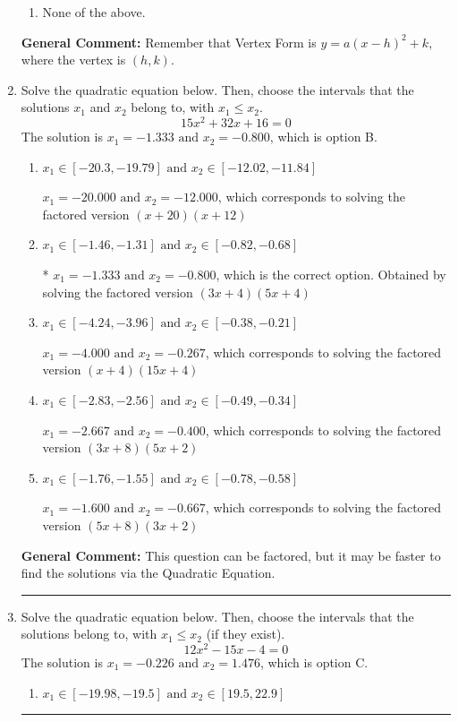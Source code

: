 \documentclass{extbook}[14pt]
\newcommand{\litem}[1]{\item #1

\rule{\textwidth}{0.4pt}}
\begin{document}
\begin{enumerate}
{\begin{enumerate}[label=\Alph*.]
\begin{multicols}{2}
\end{multicols}\item None of the above.\end{enumerate}
\textbf{General Comment:} Remember that Vertex Form is $y = a(x-h)^2+k$, where the vertex is $(h, k)$.
}
\litem{
Solve the quadratic equation below. Then, choose the intervals that the solutions $x_1$ and $x_2$ belong to, with $x_1 \leq x_2$.
\[ 15x^{2} +32 x + 16 = 0 \]The solution is \( x_1 = -1.333 \text{ and } x_2 = -0.800 \), which is option B.\begin{enumerate}[label=\Alph*.]
\item \( x_1 \in [-20.3, -19.79] \text{ and } x_2 \in [-12.02, -11.84] \)

$x_1 = -20.000 \text{ and } x_2 = -12.000$, which corresponds to solving the factored version $(x + 20)(x + 12)$
\item \( x_1 \in [-1.46, -1.31] \text{ and } x_2 \in [-0.82, -0.68] \)

* $x_1 = -1.333 \text{ and } x_2 = -0.800$, which is the correct option. Obtained by solving the factored version $(3x + 4)(5x + 4)$
\item \( x_1 \in [-4.24, -3.96] \text{ and } x_2 \in [-0.38, -0.21] \)

$x_1 = -4.000 \text{ and } x_2 = -0.267$, which corresponds to solving the factored version $(x + 4)(15x + 4)$
\item \( x_1 \in [-2.83, -2.56] \text{ and } x_2 \in [-0.49, -0.34] \)

$x_1 = -2.667 \text{ and } x_2 = -0.400$, which corresponds to solving the factored version $(3x + 8)(5x + 2)$
\item \( x_1 \in [-1.76, -1.55] \text{ and } x_2 \in [-0.78, -0.58] \)

$x_1 = -1.600 \text{ and } x_2 = -0.667$, which corresponds to solving the factored version $(5x + 8)(3x + 2)$
\end{enumerate}

\textbf{General Comment:} This question can be factored, but it may be faster to find the solutions via the Quadratic Equation.
}
\litem{
Solve the quadratic equation below. Then, choose the intervals that the solutions belong to, with $x_1 \leq x_2$ (if they exist).
\[ 12x^{2} -15 x -4 = 0 \]The solution is \( x_1 = -0.226 \text{ and } x_2 = 1.476 \), which is option C.\begin{enumerate}[label=\Alph*.]
\item \( x_1 \in [-19.98, -19.5] \text{ and } x_2 \in [19.5, 22.9] \)


\end{enumerate}}
\end{enumerate}
\end{document}
